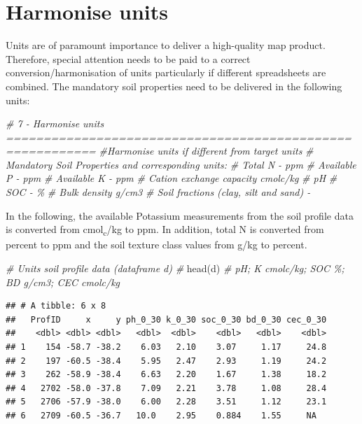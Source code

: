 \documentclass[
  10pt,
  b5paper,
  oneside]{book}
\newenvironment{Shaded}{\begin{snugshade}}{\end{snugshade}}
\newcommand{\CommentTok}[1]{\textcolor[rgb]{0.56,0.35,0.01}{\textit{#1}}}
\newcommand{\FunctionTok}[1]{\textcolor[rgb]{0.00,0.00,0.00}{#1}}
\newcommand{\NormalTok}[1]{#1}
\begin{document}
\hypertarget{harmonise-units}{%
\section{Harmonise units}\label{harmonise-units}}

Units are of paramount importance to deliver a high-quality map product. Therefore, special attention needs to be paid to a correct conversion/harmonisation of units particularly if different spreadsheets are combined. The mandatory soil properties need to be delivered in the following units:

\begin{Shaded}
\begin{Highlighting}[]
\CommentTok{\# 7 {-} Harmonise units ==========================================================}
\CommentTok{\#Harmonise units if different from target units}
\CommentTok{\# Mandatory Soil Properties and corresponding units:}
\CommentTok{\# Total N {-} ppm}
\CommentTok{\# Available P {-} ppm}
\CommentTok{\# Available K {-} ppm}
\CommentTok{\# Cation exchange capacity cmolc/kg}
\CommentTok{\# pH}
\CommentTok{\# SOC {-} \%}
\CommentTok{\# Bulk density g/cm3}
\CommentTok{\# Soil fractions (clay, silt and sand) {-} }
\end{Highlighting}
\end{Shaded}

In the following, the available Potassium measurements from the soil profile data is converted from cmol\textsubscript{c}/kg to ppm. In addition, total N is converted from percent to ppm and the soil texture class values from g/kg to percent.

\begin{Shaded}
\begin{Highlighting}[]
\CommentTok{\# Units soil profile data (dataframe d)}
\CommentTok{\# }
\FunctionTok{head}\NormalTok{(d) }\CommentTok{\# pH; K cmolc/kg; SOC \%; BD g/cm3; CEC  cmolc/kg}
\end{Highlighting}
\end{Shaded}

\begin{verbatim}
## # A tibble: 6 x 8
##   ProfID     x     y ph_0_30 k_0_30 soc_0_30 bd_0_30 cec_0_30
##    <dbl> <dbl> <dbl>   <dbl>  <dbl>    <dbl>   <dbl>    <dbl>
## 1    154 -58.7 -38.2    6.03   2.10    3.07     1.17     24.8
## 2    197 -60.5 -38.4    5.95   2.47    2.93     1.19     24.2
## 3    262 -58.9 -38.4    6.63   2.20    1.67     1.38     18.2
## 4   2702 -58.0 -37.8    7.09   2.21    3.78     1.08     28.4
## 5   2706 -57.9 -38.0    6.00   2.28    3.51     1.12     23.1
## 6   2709 -60.5 -36.7   10.0    2.95    0.884    1.55     NA
\end{verbatim}
\end{document}
